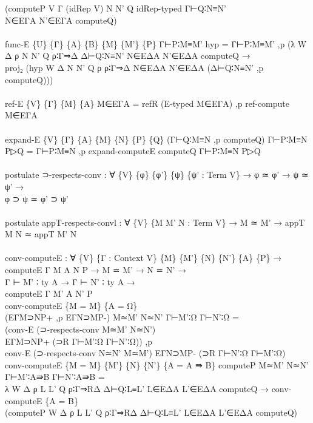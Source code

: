 {\begin{code}
{\>    (computeP V Γ (idRep V) N N' Q idRep-typed Γ⊢Q∶N≡N' \<\\
\>      N∈EΓA N'∈EΓA computeQ)\<\\
\>\<\\
\>func-E \{U\} \{Γ\} \{A\} \{B\} \{M\} \{M'\} \{P\} Γ⊢P∶M≡M' hyp = Γ⊢P∶M≡M' ,p (λ W Δ ρ N N' Q ρ∶Γ⇒Δ Δ⊢Q∶N≡N' N∈EΔA N'∈EΔA computeQ → \<\\
\>  proj₂ (hyp W Δ N N' Q ρ ρ∶Γ⇒Δ N∈EΔA N'∈EΔA (Δ⊢Q∶N≡N' ,p computeQ)))\<\\
\>\<\\
\>ref-E \{V\} \{Γ\} \{M\} \{A\} M∈EΓA = refR (E-typed M∈EΓA) ,p ref-compute M∈EΓA\<\\
\>\<\\
\>expand-E \{V\} \{Γ\} \{A\} \{M\} \{N\} \{P\} \{Q\} (Γ⊢Q∶M≡N ,p computeQ) Γ⊢P∶M≡N P▷Q = Γ⊢P∶M≡N ,p expand-computeE computeQ Γ⊢P∶M≡N P▷Q\<\\
\>\<\\
\>postulate ⊃-respects-conv : ∀ \{V\} \{φ\} \{φ'\} \{ψ\} \{ψ' : Term V\} → φ ≃ φ' → ψ ≃ ψ' →\<\\
\>                          φ ⊃ ψ ≃ φ' ⊃ ψ'\<\\
\>\<\\
\>postulate appT-respects-convl : ∀ \{V\} \{M M' N : Term V\} → M ≃ M' → appT M N ≃ appT M' N\<\\
\>\<\\
\>conv-computeE : ∀ \{V\} \{Γ : Context V\} \{M\} \{M'\} \{N\} \{N'\} \{A\} \{P\} →\<\\
\>             computeE Γ M A N P → M ≃ M' → N ≃ N' → \<\\
\>             Γ ⊢ M' ∶ ty A  → Γ ⊢ N' ∶ ty A  →\<\\
\>             computeE Γ M' A N' P\<\\
\>conv-computeE \{M = M\} \{A = Ω\} \<\\
\>  (EΓM⊃NP+ ,p EΓN⊃MP-) M≃M' N≃N' Γ⊢M'∶Ω Γ⊢N'∶Ω = \<\\
\>  (conv-E (⊃-respects-conv M≃M' N≃N')\<\\
\>    EΓM⊃NP+ (⊃R Γ⊢M'∶Ω Γ⊢N'∶Ω)) ,p \<\\
\>  conv-E (⊃-respects-conv N≃N' M≃M') EΓN⊃MP- (⊃R Γ⊢N'∶Ω Γ⊢M'∶Ω)\<\\
\>conv-computeE \{M = M\} \{M'\} \{N\} \{N'\} \{A = A ⇛ B\} computeP M≃M' N≃N' Γ⊢M'∶A⇛B Γ⊢N'∶A⇛B =\<\\
\>  λ W Δ ρ L L' Q ρ∶Γ⇒RΔ Δ⊢Q∶L≡L' L∈EΔA L'∈EΔA computeQ → conv-computeE \{A = B\} \<\\
\>  (computeP W Δ ρ L L' Q ρ∶Γ⇒RΔ Δ⊢Q∶L≡L' L∈EΔA L'∈EΔA computeQ) \<\\
}
\end{code}}
